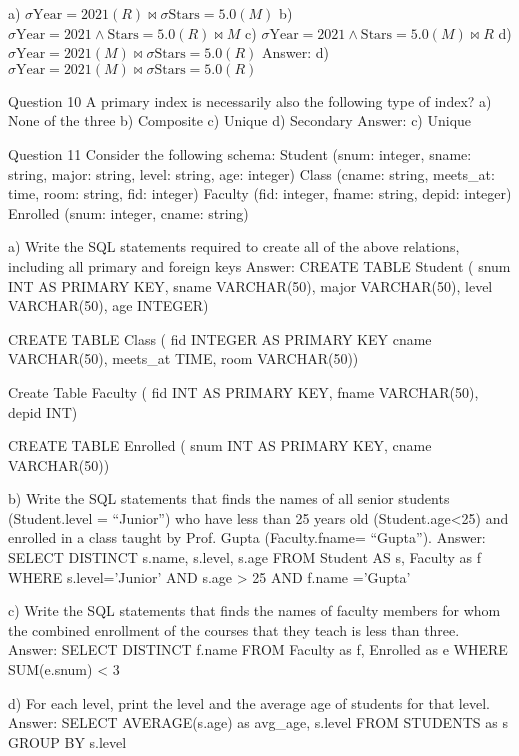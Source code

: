   a) $\sigma\text{Year} = 2021(R) \bowtie \sigma\text{Stars} = 5.0(M)$
  b) $\sigma\text{Year} = 2021 \wedge \text{Stars} = 5.0(R) \bowtie M$
  c) $\sigma\text{Year} = 2021 \wedge \text{Stars} = 5.0(M) \bowtie R$
  d) $\sigma\text{Year} = 2021(M) \bowtie \sigma\text{Stars} = 5.0(R)$
  Answer: d) $\sigma\text{Year} = 2021(M) \bowtie \sigma\text{Stars} = 5.0(R)$

  Question 10
  A primary index is necessarily also the following type of index?
  a) None of the three
  b) Composite
  c) Unique
  d) Secondary
  Answer: c) Unique

  Question 11
  Consider the following schema: 
    Student (snum: integer, sname: string, major: string, level: string, age: integer)
    Class (cname: string, meets_at: time, room: string,  fid: integer)
    Faculty (fid: integer,  fname: string, depid: integer)
    Enrolled (snum: integer, cname: string)

  a) Write the SQL statements required to create all of the above relations, including all primary and foreign keys
    Answer:
    CREATE TABLE Student (
    snum INT AS PRIMARY KEY,
    sname VARCHAR(50),
    major VARCHAR(50),
    level VARCHAR(50),
    age INTEGER)

    CREATE TABLE Class (
    fid INTEGER AS PRIMARY KEY
    cname VARCHAR(50),
    meets_at TIME,
    room VARCHAR(50))

    Create Table Faculty (
    fid INT AS PRIMARY KEY, 
    fname VARCHAR(50),
    depid INT)

    CREATE TABLE Enrolled (
    snum INT AS PRIMARY KEY,
    cname VARCHAR(50))

  b) Write the SQL statements that finds the names of all senior students (Student.level = “Junior”) who have less than 25 years old (Student.age<25) and enrolled in a class taught by Prof. Gupta (Faculty.fname= “Gupta”).
    Answer:
    SELECT DISTINCT s.name, s.level, s.age
    FROM Student AS s, Faculty as f
    WHERE s.level='Junior' AND s.age > 25 AND f.name ='Gupta'

  c) Write the SQL statements that finds the names of faculty members for whom the combined enrollment of the courses that they teach is less than three.
    Answer:
    SELECT DISTINCT f.name
    FROM Faculty as f, Enrolled as e
    WHERE SUM(e.snum) < 3

  d) For each level, print the level and the average age of students for that level.
    Answer:
    SELECT AVERAGE(s.age) as avg_age, s.level
    FROM STUDENTS as s
    GROUP BY s.level

